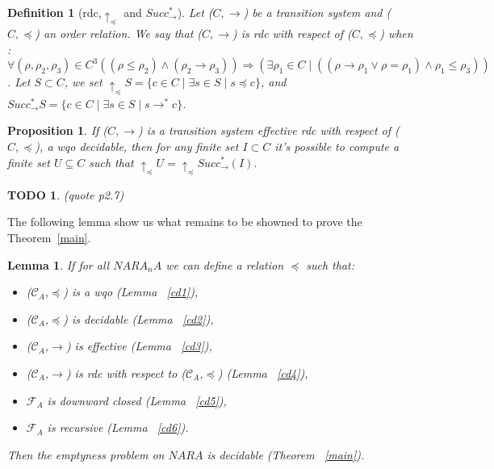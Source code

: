 \documentclass[a4paper,10pt]{report}
\newtheorem{lm}{Lemma}[thr]
\newtheorem{pp}{Proposition}
\newtheorem{df}{Definition}
\newtheorem{td}{TODO}
\newcommand{\C}{\mathcal{C}_{A}}
\newcommand{\F}{\mathcal{F}_{A}}
\begin{document}
\begin{df}[rdc,$\uparrow_\preceq$ and $ Succ^*_\rightarrow$]
  Let ($C,\rightarrow$) be a transition system and ($C,\preceq$) an order relation.
  We say that ($C,\rightarrow$) is rdc with respect of ($C,\preceq$) when :
 $$\forall (\rho,\rho_2,\rho_3) \in C^3  ((\rho \leq \rho_2) \wedge (\rho_2 \rightarrow \rho_3)) \Rightarrow (\exists \rho_1 \in C \mid ((\rho \rightarrow \rho_1 \vee \rho = \rho_1) \wedge \rho_1 \leq \rho_3))$$.
  Let $S \subset C$,
  we set $\uparrow_\preceq S = \{c \in C \mid \exists s \in S \mid s \preceq c \}$, and $Succ^*_\rightarrow S = \{c \in C \mid \exists s \in S \mid s \rightarrow^* c \}$.
\end{df}


\begin{pp} 
  \label{pp}
  If  ($C,\rightarrow$) is a transition system effective rdc with respect of ($C,\preceq$), a wqo decidable, then for any finite set $I\subset C$ it's possible to compute a finite set $U \subseteq C$ such that
  $\uparrow_\preceq U=\uparrow_\preceq Succ^*_\rightarrow (I)$.
\end{pp}

\begin{td}
  (quote p2.7)
\end{td}

The following lemma show us what remains to be showned to prove the Theorem~\ref{main}.
\begin{lm}
    \label{mlm}
    If for all $NARA_nA$ we can define a relation $\preceq$ such that: 
     \begin{itemize}
	\item ($\C$,$\preceq$) is a wqo (Lemma ~\ref{cd1}),
	\item ($\C$,$\preceq$) is decidable (Lemma ~\ref{cd2}),
	\item ($\C$,$\rightarrow$) is effective (Lemma ~\ref{cd3}),
	\item ($\C$,$\rightarrow$) is rdc with respect to ($\C$,$\preceq$) (Lemma ~\ref{cd4}),
	\item $\F$ is downward closed (Lemma ~\ref{cd5}),
	\item $\F$ is recursive (Lemma ~\ref{cd6}).
     \end{itemize}
      Then the emptyness problem on $NARA$ is decidable (Theorem ~\ref{main}).
\end{lm}
\end{document}
